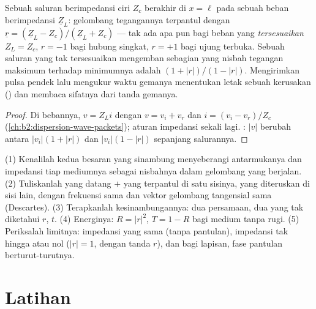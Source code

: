 \begin{proposition}\label{prop:b2:wave-interfaces:coax}
Sebuah saluran berimpedansi ciri $Z_c$ berakhir di $x = \ell$ pada sebuah beban
berimpedansi $\underline Z_L$: gelombang tegangannya terpantul dengan $\underline r =
(\underline Z_L - Z_c)/(\underline Z_L + Z_c)$ --- tak ada apa pun bagi beban yang
\emph{tersesuaikan} $Z_L = Z_c$, $r = -1$ bagi hubung singkat, $r = +1$ bagi ujung terbuka. Sebuah
saluran yang tak tersesuaikan mengemban  sebagian yang nisbah tegangan maksimum
terhadap minimumnya adalah \emph{} $(1 + |r|)/(1 - |r|)$.
Mengirimkan pulsa pendek lalu mengukur waktu gemanya menentukan letak sebuah kerusakan () dan membaca sifatnya dari tanda gemanya.
\end{proposition}

\begin{proof}
Di bebannya, $v = Z_Li$ dengan $v = v_i + v_r$ dan $i = (v_i - v_r)/Z_c$
(\cref{ch:b2:dispersion-wave-packets}); aturan impedansi sekali lagi.
: $|v|$ berubah antara $|v_i|(1 + |r|)$ dan $|v_i|(1 -
|r|)$ sepanjang salurannya.
\end{proof}

\begin{method}\label{met:b2:wave-interfaces:method}
(1) Kenalilah kedua besaran yang sinambung menyeberangi antarmukanya dan
impedansi tiap mediumnya sebagai nisbahnya dalam gelombang yang berjalan.
(2) Tuliskanlah yang datang $+$ yang terpantul di satu sisinya, yang diteruskan di sisi lain,
dengan frekuensi sama dan vektor gelombang tangensial sama (Descartes).
(3) Terapkanlah kesinambungannya: dua persamaan, dua yang tak diketahui $r$, $t$. (4) Energinya:
$R = |r|^2$, $T = 1 - R$ bagi medium tanpa rugi. (5) Periksalah limitnya: impedansi
yang sama (tanpa pantulan), impedansi tak hingga atau nol ($|r| = 1$, dengan tanda
$r$), dan bagi lapisan, fase pantulan berturut-turutnya.
\end{method}

\section{Latihan}

